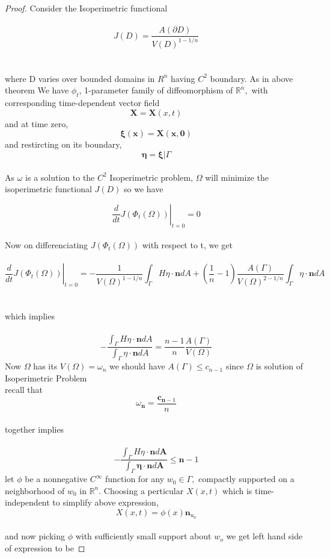 \documentclass[oneside]{book}
\theoremstyle{definition}
\begin{document}
\begin{proof}

Consider the Isoperimetric functional \\\\
\begin{equation}
\label{eq35}
J(D)=\frac{A(\partial D)}{V(D)^{1-1 / n}}
 \end{equation}
 \\\\
where D varies over bounded domains in $R^{n}$ having $C^{2}$ boundary.
As in above \\ theorem We have $\phi_{t}$, 1-parameter family of diffeomorphism of $\mathbb{R}^{n},$ with corresponding time-dependent vector field $$\boldsymbol{X} = \boldsymbol{X}(x, t)$$ and at time zero,\\ $$\boldsymbol{\xi}(\boldsymbol{x})=\boldsymbol{X}(\boldsymbol{x}, \boldsymbol{0})$$ and  restircting on its boundary,   \\      $$\boldsymbol{\eta}=\boldsymbol{\xi} | \Gamma $$ \\
As $\omega$ is a solution to the  $C^{2}$ Isoperimetric problem, $\Omega$ will minimize the isoperimetric functional $J(D)$ so we have


$$\left.\frac{d}{d t} J\left(\Phi_{t}(\Omega)\right)\right|_{t=0} = 0 $$ \\ 
Now on differenciating $J(\Phi_{t}(\Omega))$ with respect to t,
we get \\\\
$$\left.\frac{d}{d t} J\left(\Phi_{t}(\Omega)\right)\right|_{t=0} =  -\frac{1}{V(\Omega)^{1-1 / n}} \int_{\Gamma} H \eta \cdot \mathbf{n} d A+\left(\frac{1}{n}-1\right) \frac{A(\Gamma)}{V(\Omega)^{2-1 / n}} \int_{\Gamma} \eta \cdot \mathbf{n} d A 
$$ \\\\
which implies \\\\
$$
-\frac{\int_{\Gamma} H \eta \cdot \mathbf{n} d A}{\int_{\Gamma} \eta \cdot \mathbf{n} d A}=\frac{n-1}{n} \frac{A(\Gamma)}{V(\Omega)}
$$
Now $\Omega$ has its $V(\Omega) = \omega_{n}$ we should have $A(\Gamma) \leq c_{n-1}$ since $\Omega $ is solution of Isoperimetric Problem \\
 recall that \\ $$ \omega_{\mathbf{n}}=\frac{\mathbf{c}_{\mathbf{n}-1}}{n}$$ \\
 together  implies \\\\
 \begin{equation}
 \label{eq36}
 -\frac{\int_{\Gamma} H \eta \cdot \mathbf{n} d \boldsymbol{A}}{\int_{\Gamma} \boldsymbol{\eta} \cdot \mathbf{n} d \boldsymbol{A}} \leq \boldsymbol{n}-1 
 \end{equation}
 let $\phi$ be a nonnegative $C^{\infty}$ function for any $w_{0} \in \Gamma,$ compactly supported on a neighborhood of $w_{0}$ in $\mathbb{R}^{n}$.
 Choosing a perticular $X(x, t)$ which is time-independent to  simplify above expression, \\
$$
X(x, t)=\phi(x) \mathbf{n}_{u_{0}}
$$
\\
and now picking $\phi$ with sufficiently small support about $w_{o}$ we get left hand side of expression to be 


\end{proof}
\end{document}
